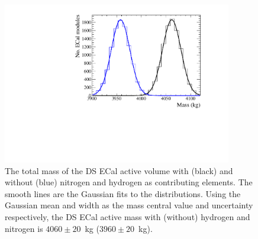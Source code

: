 \begin{figure}
  \centering
  \includegraphics[width=10cm]{images/measurement/systematics/detector/mass/TotalMass_DSECal.eps}
  \caption{The total mass of the DS ECal active volume with (black) and without (blue) nitrogen and hydrogen as contributing elements.  The smooth lines are the Gaussian fits to the distributions.  Using the Gaussian mean and width as the mass central value and uncertainty respectively, the DS ECal active mass with (without) hydrogen and nitrogen is $4060\pm20$~kg ($3960\pm20$~kg).}
  \label{fig:TotalMassDSECal}
\end{figure}
